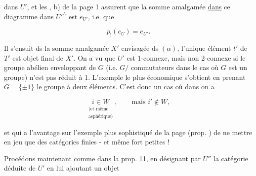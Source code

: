 

dans $U'$, et les  , b) de la page 1 assurent que la somme amalgamée \uline{dans}  ce diagramme dans $U'^\wedge$ est $e_{U'}$, i.e. que

\[
 p_!(e_U)=e_{U'}.
\]

Il s'ensuit  ds la somme amalgamée $X'$ envisagée ds $(\alpha)$, l'unique élément $t'$ de $T'$ est objet final de $X'$. On a vu que $U'$  est 1-connexe, mais non 2-connexe si le groupe abélien enveloppant de $G$ (i.e. $G/$ commutateurs dans le cas où $G$ est un groupe) n'est pas réduit à 1. L'exemple le plus économique s'obtient en prenant $G=\{\pm1\}$ le groupe à deux éléments. C'est donc un cas où dans  on a

\[
 \underset{\substack{\text{(et même}\\\text{asphérique)}}}{i\in W},\qquad \text{mais }i'\notin W,
\]

et qui a l'avantage sur l'exemple plus sophistiqué de la page  (prop. ) de ne mettre en jeu que des catégories finies - et même fort petites !

Procédons maintenant comme dans la prop. 11, en désignant par $U''$ la catégorie déduite de $U'$ en lui ajoutant un objet


